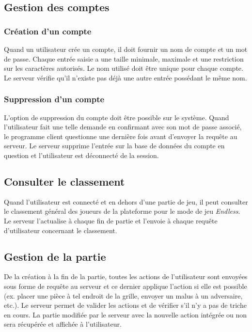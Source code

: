 \documentclass{article}
\begin{document}
\subsection{Gestion des comptes}

\subsubsection{Création d'un compte}

Quand un utilisateur crée un compte, il doit fournir un nom de compte et un mot de passe. Chaque entrée saisie a une taille minimale, maximale et une restriction sur les caractères autorisés. Le nom utilisé doit être unique pour chaque compte.\\
Le serveur vérifie qu'il n'existe pas déjà une autre entrée possédant le même nom. 

\subsubsection{Suppression d'un compte}

L'option de suppression du compte doit être possible sur le système. Quand l'utilisateur fait une telle demande en confirmant avec son mot de passe associé, le programme client questionne une dernière fois avant d'envoyer la requête au serveur. Le serveur supprime l'entrée sur la base de données du compte en question et l'utilisateur est déconnecté de la session.

\subsection{Consulter le classement}

Quand l'utilisateur est connecté et en dehors d'une partie de jeu, il peut consulter le classement général des joueurs de la plateforme pour le mode de jeu \textit{Endless}. Le serveur l'actualise à chaque fin de partie et l'envoie à chaque requête d'utilisateur concernant le classement.

\subsection{Gestion de la partie}

De la création à la fin de la partie, toutes les actions de l'utilisateur sont envoyées sous forme de requête au serveur et ce dernier applique l'action si elle est possible (ex. placer une pièce à tel endroit de la grille, envoyer un malus à un adversaire, etc.). Le serveur permet de valider les actions et de vérifier s'il n'y a pas de triche en cours. La partie modifiée par le serveur avec la nouvelle action intégrée ou non sera récupérée et affichée à l'utilisateur.
\end{document}
